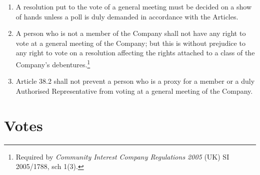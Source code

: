 \documentclass[a4paper,12pt]{article}
\begin{document}
\begin{enumerate}
  \item A resolution put to the vote of a general meeting must be decided on a show of hands unless a poll is duly demanded in accordance with the Articles.
  \item A person who is not a member of the Company shall not have any right to vote at a general meeting of the Company; but this is without prejudice to any right to vote on a resolution affecting the rights attached to a class of the Company's debentures.\footnote{Required by \textit{Community Interest Company Regulations 2005} (UK) SI 2005/1788, sch 1(3).}
  \item Article 38.2 shall not prevent a person who is a proxy for a member or a duly Authorised Representative from voting at a general meeting of the Company.
\end{enumerate}

\section{Votes}
\end{document}
